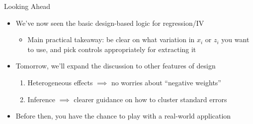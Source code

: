 \documentclass[11pt,english]{beamer}
\begin{document}
\begin{frame}{Looking Ahead}
\begin{itemize}
\item We've now seen the basic design-based logic for regression/IV\smallskip
\begin{itemize}
\item Main practical takeaway: be clear on what variation in $x_i$ or $z_i$ you want to use, and pick controls appropriately for extracting it
\end{itemize}\bigskip\pause{}

\item Tomorrow, we'll expand the discussion to other features of design\smallskip
\begin{enumerate}
\item Heterogeneous effects $\implies$ no worries about ``negative weights''\smallskip
\item Inference $\implies$ clearer guidance on how to cluster standard errors
\end{enumerate}\bigskip\pause{}

\item Before then, you have the chance to play with a real-world application
\end{itemize}
\end{frame}
\end{document}
